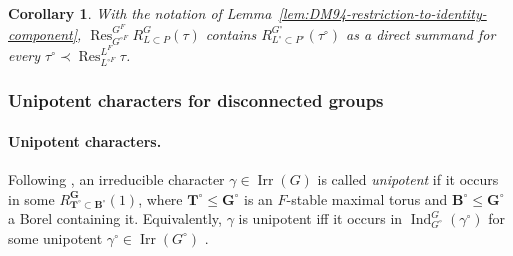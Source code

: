 \documentclass{amsart}
\theoremstyle{plain}
\numberwithin{equation}{section}
\newtheorem{corollary}[theorem]{Corollary}
\theoremstyle{definition}
\newcommand{\Ind}{\operatorname{Ind}}
\newcommand{\Res}{\operatorname{Res}}
\newcommand{\Irr}{\operatorname{Irr}}
\begin{document}
\begin{corollary}\label{cor:HC-induction-restricts-contains-connected}
With the notation of Lemma~\ref{lem:DM94-restriction-to-identity-component},
$\Res^{G^F}_{G^{\circ F}} R^G_{L\subset P}(\tau)$ contains $R^{G^\circ}_{L^\circ\subset P^\circ}(\tau^\circ)$
as a direct summand for every $\tau^\circ\prec\Res^{L^F}_{L^{\circ F}}\tau$.
\end{corollary}

\subsubsection{Unipotent characters for disconnected groups}\label{subsubsec:unipotent-characters-for-disconnected}

\paragraph{Unipotent characters.}
Following {\cite[\S6.4]{Bonnafe1999Produit}}, an irreducible character $\gamma\in \Irr(G)$ is called
\emph{unipotent} if it occurs in some $R_{\mathbf T^\circ\subset \mathbf B^\circ}^{\mathbf G}(1)$,
where $\mathbf T^\circ\le \mathbf G^\circ$ is an $F$-stable maximal torus and $\mathbf B^\circ\le \mathbf G^\circ$
a Borel containing it.
Equivalently, $\gamma$ is unipotent iff it occurs in $\Ind_{G^\circ}^G(\gamma^\circ)$ for some unipotent
$\gamma^\circ\in \Irr(G^\circ)$ {\cite[Lem.~6.4.2]{Bonnafe1999Produit}}.
\end{document}
